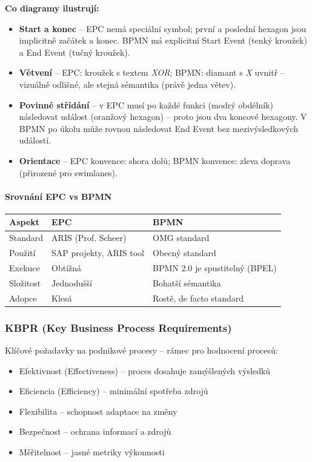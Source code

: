 \noindent\textbf{Co diagramy ilustrují:}
\begin{itemize}
  \item \textbf{Start a konec} -- EPC nemá speciální symbol; první a poslední hexagon jsou implicitně
    začátek a konec. BPMN má explicitní Start Event (tenký kroužek) a End Event (tučný kroužek).
  \item \textbf{Větvení} -- EPC: kroužek s textem \textit{XOR}; BPMN: diamant s \textit{X} uvnitř --
    vizuálně odlišné, ale stejná sémantika (právě jedna větev).
  \item \textbf{Povinné střídání} -- v EPC musí po každé funkci (modrý obdélník) následovat událost
    (oranžový hexagon) -- proto jsou dva koncové hexagony. V BPMN po úkolu může rovnou následovat
    End Event bez mezivýsledkových událostí.
  \item \textbf{Orientace} -- EPC konvence: shora dolů; BPMN konvence: zleva doprava (přirozené pro swimlanes).
\end{itemize}

\paragraph{Srovnání EPC vs BPMN}

\begin{center}
\begin{tabular}{lll}
\toprule
\textbf{Aspekt} & \textbf{EPC} & \textbf{BPMN} \\
\midrule
Standard & ARIS (Prof. Scheer) & OMG standard \\
Použití & SAP projekty, ARIS tool & Obecný standard \\
Exekuce & Obtížná & BPMN 2.0 je spustitelný (BPEL) \\
Složitost & Jednodušší & Bohatší sémantika \\
Adopce & Klesá & Rostě, de facto standard \\
\bottomrule
\end{tabular}
\end{center}

\subsubsection{KBPR (Key Business Process Requirements)}

Klíčové požadavky na podnikové procesy -- rámec pro hodnocení procesů:
\begin{itemize}
  \item Efektivnost (Effectiveness) -- proces dosahuje zamýšlených výsledků
  \item Eficiencia (Efficiency) -- minimální spotřeba zdrojů
  \item Flexibilita -- schopnost adaptace na změny
  \item Bezpečnost -- ochrana informací a zdrojů
  \item Měřitelnost -- jasné metriky výkonnosti
\end{itemize}

